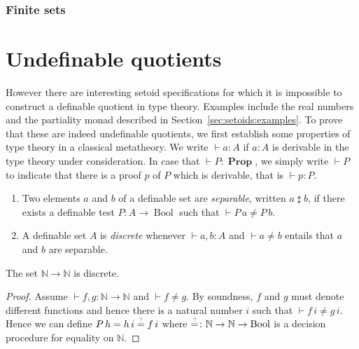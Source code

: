 \documentclass[envcountsame]{llncs}
\newcommand{\N}{\mathbb{N}}
\DeclareMathOperator{\Prop}{\mathbf{Prop}}
\DeclareMathOperator{\Bool}{Bool}
\DeclareMathOperator{\order}{order}
\newcommand{\eqqm}{\overset{\text{\tiny ?}}{=}}
\newcommand{\sep}{\mathrel{\sharp}}
\begin{document}
\begin{description}
\end{description}

\subsubsection*{Finite sets}


\section{Undefinable quotients}
However there are interesting setoid specifications for which it is impossible to construct a definable quotient in type theory. Examples include the real numbers and the partiality monad described in Section~\ref{sec:setoids:examples}.
To prove that these are indeed undefinable quotients, we first establish some properties of type theory in a classical metatheory.
We write $\vdash a : A$ if $a : A$ is derivable in the type theory under consideration. In case that $\vdash P : \Prop$, we simply  write $\vdash P$ to indicate that there is a proof $p$ of $P$ which is derivable, that is $\vdash p : P$.
\begin{definition}\hfill
\begin{enumerate}
\item Two elements $a$ and $b$ of a definable set are \emph{separable}, written $a \sep b$, if there exists a definable test $P\colon A\to \Bool$ such that $\vdash P\,a \neq P\,b$.
\item A definable set $A$ is \emph{discrete} whenever $\vdash a, b :A$ and   $\vdash a\not= b$
entails that $a$ and $b$ are separable.
\end{enumerate}
\end{definition}

\begin{proposition}\label{prop:NtoNdiscrete}
The set $\N\to\N$ is discrete.
\end{proposition}
\begin{proof}
Assume $\vdash f, g\colon \N \to \N$ and $\vdash f\neq g$. By soundness, $f$ and $g$ must denote different functions and hence there is a natural number $i$ such that $\vdash f\,i\neq g\,i$. Hence we can define $P\,h = {h\,i} \eqqm {f\,i}$ where ${\eqqm}\colon \N\to\N\to\Bool$ is a decision procedure for equality on $\N$.
\end{proof}
\end{document}
